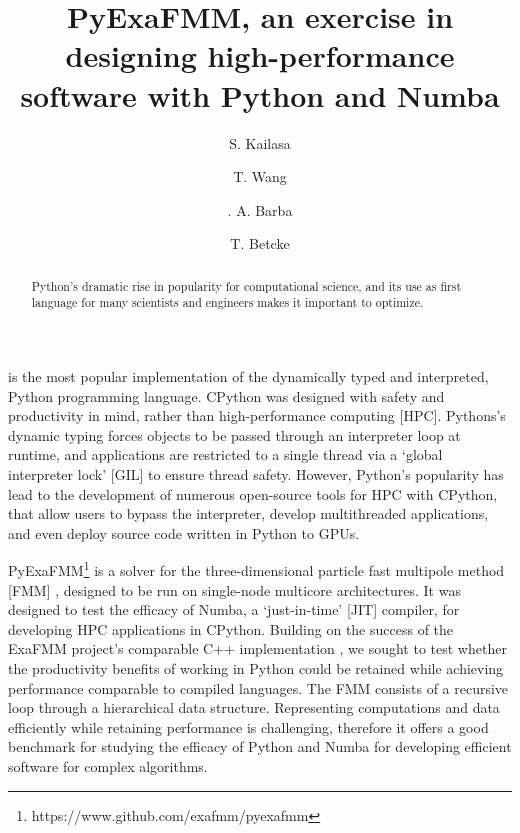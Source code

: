 \documentclass{IEEEcsmag}
\begin{document}

\title{PyExaFMM, an exercise in designing high-performance software with Python and Numba}

\author{S. Kailasa}

\author{T. Wang}

\author{. A. Barba}

\author{T. Betcke}


\begin{abstract}
    Python's dramatic rise in popularity for computational science, and its use as first language for many scientists and engineers makes it important to optimize. 
\end{abstract}

\maketitle
{} is the most popular implementation of the dynamically typed and interpreted, Python programming language. CPython was designed with safety and productivity in mind, rather than high-performance computing [HPC]. Pythons's dynamic typing forces objects to be passed through an interpreter loop at runtime, and applications are restricted to a single thread via a `global interpreter lock' [GIL] to ensure thread safety. However, Python's popularity has lead to the development of numerous open-source tools for HPC with CPython, that allow users to bypass the interpreter, develop multithreaded applications, and even deploy source code written in Python to GPUs.

PyExaFMM\footnote{https://www.github.com/exafmm/pyexafmm} is a solver for the three-dimensional particle fast multipole method [FMM] \cite{Greengard1987}, designed to be run on single-node multicore architectures. It was designed to test the efficacy of Numba, a `just-in-time' [JIT] compiler, for developing HPC applications in CPython. Building on the success of the ExaFMM project's comparable C++ implementation \cite{Wang2021}, we sought to test whether the productivity benefits of working in Python could be retained while achieving performance comparable to compiled languages.  The FMM consists of a recursive loop through a hierarchical data structure. Representing computations and data efficiently while retaining performance is challenging, therefore it offers a good benchmark for studying the efficacy of Python and Numba for developing efficient software for complex algorithms.
\end{document}
